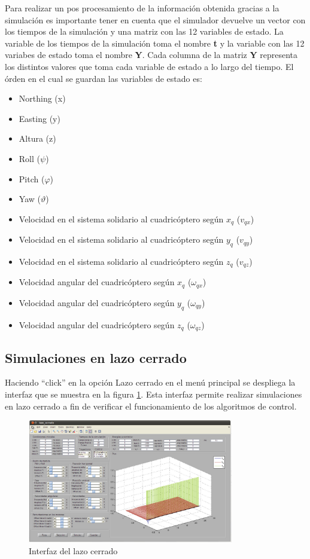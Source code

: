 \documentclass[main]{subfiles}
\begin{document}
Para realizar un pos procesamiento de la informaci\'on obtenida gracias a la simulaci\'on es importante tener en cuenta que el simulador devuelve un vector con los tiempos de la simulaci\'on y una matriz con las 12 variables de estado. La variable de los tiempos de la simulaci\'on toma el nombre \textbf{t} y la variable con las 12 variabes de estado toma el nombre \textbf{Y}. Cada columna de la matriz \textbf{Y} representa los distintos valores que toma cada variable de estado a lo largo del tiempo. El \'orden en el cual se guardan las variables de estado es:
\begin{itemize}
\item Northing (x)
\item Easting (y)
\item Altura (z)
\item Roll ($\psi$)
\item Pitch ($\varphi$)
\item Yaw ($\vartheta$)
\item Velocidad en el sistema solidario al cuadric\'optero seg\'un $x_q$ ($v_{qx}$)
\item Velocidad en el sistema solidario al cuadric\'optero seg\'un $y_q$ ($v_{qy}$)
\item Velocidad en el sistema solidario al cuadric\'optero seg\'un $z_q$ ($v_{qz}$)
\item Velocidad angular del cuadric\'optero seg\'un $x_q$ ($\omega_{qx}$)
\item Velocidad angular del cuadric\'optero seg\'un $y_q$ ($\omega_{qy}$)
\item Velocidad angular del cuadric\'optero seg\'un $z_q$ ($\omega_{qz}$)
\end{itemize} 

\subsection*{Simulaciones en lazo cerrado}
Haciendo ``click'' en la opci\'on Lazo cerrado en el men\'u principal se despliega la interfaz que se muestra en la figura \ref{fig:anexo:lazo_cerrado}. Esta interfaz permite realizar simulaciones en lazo cerrado a fin de verificar el funcionamiento de los algoritmos de control.
\begin{figure}
\centering
  \includegraphics[width=0.8\textwidth]{./pics_anexo_simulador/anexo:lazo_cerrado.pdf}
\caption{Interfaz del lazo cerrado}
\vspace{-20pt}
\label{fig:anexo:lazo_cerrado}
\end{figure} 
\end{document}

